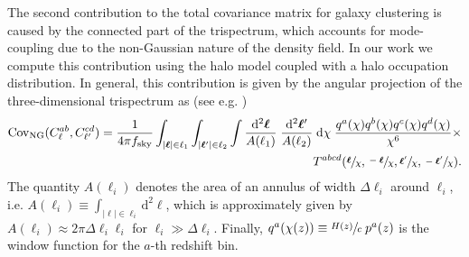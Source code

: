 \documentclass[a4paper,11pt]{article}
\begin{document}
    The second contribution to the total covariance matrix for galaxy clustering is caused by the connected part of the trispectrum, which accounts for mode-coupling due to the non-Gaussian nature of the density field. In our work we compute this contribution using the halo model coupled with a halo occupation distribution. In general, this contribution is given by the angular projection of the three-dimensional trispectrum as (see e.g. \cite{Krause:2017})
    \begin{equation}
    \begin{aligned}
      \mathrm{Cov}_{\mathrm{NG}}(C^{ab}_{\ell}, C^{cd}_{\ell'}) = \frac{1}{4 \pi f_{\mathrm{sky}}} \int_{\vert \boldsymbol{\ell} \vert \in \ell_{1}} \int_{\vert \boldsymbol{\ell}' \vert \in \ell_{2}} \int \frac{\mathrm{d}^{2}\boldsymbol{\ell}}{A(\ell_{1})} \; \frac{\mathrm{d}^{2}\boldsymbol{\ell}'}{A(\ell_{2})} \; \mathrm{d}\chi \; \frac{q^{a}(\chi)q^{b}(\chi)q^{c}(\chi)q^{d}(\chi)}{\chi^{6}} \times \\ T^{abcd}(\sfrac{\boldsymbol{\ell}}{\chi}, \sfrac{-\boldsymbol{\ell}}{\chi}, \sfrac{\boldsymbol{\ell}'}{\chi}, \sfrac{-\boldsymbol{\ell}'}{\chi}).
    \end{aligned}
    \end{equation}
    The quantity $A(\ell_{i})$ denotes the area of an annulus of width $\Delta \ell_{i}$ around $\ell_{i}$, i.e. $A(\ell_{i}) \equiv \int_{\vert \boldsymbol{\ell} \vert \in \ell_{i}} \mathrm{d}^{2}\boldsymbol{\ell}$, which is approximately given by $A(\ell_{i}) \approx 2 \pi \Delta \ell_{i} \ell_{i}$ for $\ell_{i} \gg \Delta \ell_{i}$. Finally, $q^a(\chi(z))\equiv \sfrac{H(z)}{c} \;p^a(z)$ is the window function for the $a$-th redshift bin.
    
\end{document}
